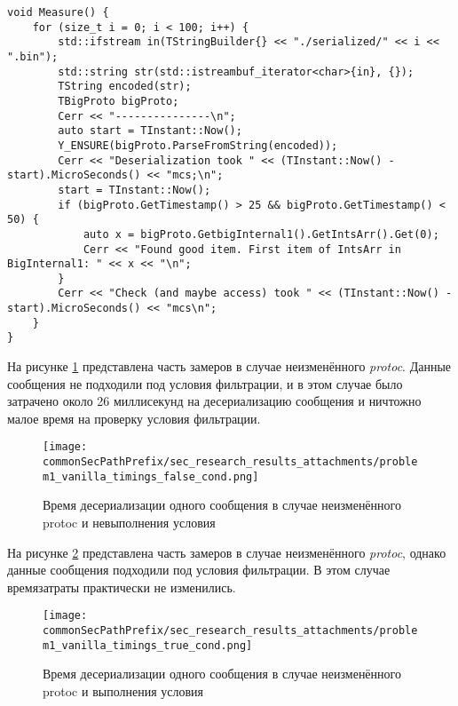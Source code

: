 \begin{lstlisting}[style=CodeListing, captionpos=b, caption={Функция Measure}, label=sec_research:code:problem1_measure]
void Measure() {
    for (size_t i = 0; i < 100; i++) {
        std::ifstream in(TStringBuilder{} << "./serialized/" << i << ".bin");
        std::string str(std::istreambuf_iterator<char>{in}, {});
        TString encoded(str);
        TBigProto bigProto;
        Cerr << "---------------\n";
        auto start = TInstant::Now();
        Y_ENSURE(bigProto.ParseFromString(encoded));
        Cerr << "Deserialization took " << (TInstant::Now() - start).MicroSeconds() << "mcs;\n";
        start = TInstant::Now();
        if (bigProto.GetTimestamp() > 25 && bigProto.GetTimestamp() < 50) {
            auto x = bigProto.GetbigInternal1().GetIntsArr().Get(0);
            Cerr << "Found good item. First item of IntsArr in BigInternal1: " << x << "\n";
        }
        Cerr << "Check (and maybe access) took " << (TInstant::Now() - start).MicroSeconds() << "mcs\n";
    }
}
\end{lstlisting}

На рисунке \ref{fig:problem1_vanilla_timings_false_cond} представлена часть замеров в случае неизменённого \textit{protoc}. 
Данные сообщения не подходили под условия фильтрации, и в этом случае было затрачено около 26 миллисекунд на десериализацию сообщения и ничтожно малое время на проверку условия фильтрации.

\begin{figure}[H]
    \centering
    \texttt{[image: \\commonSecPathPrefix/sec\_research\_results\_attachments/problem1\_vanilla\_timings\_false\_cond.png]}
    \caption{Время десериализации одного сообщения в случае неизменённого protoc и невыполнения условия}
    \label{fig:problem1_vanilla_timings_false_cond}
\end{figure}

На рисунке \ref{fig:problem1_vanilla_timings_true_cond} представлена часть замеров в случае неизменённого \textit{protoc}, однако данные сообщения подходили под условия фильтрации. В этом случае времязатраты практически не изменились.

\begin{figure}[H]
    \centering
    \texttt{[image: \\commonSecPathPrefix/sec\_research\_results\_attachments/problem1\_vanilla\_timings\_true\_cond.png]}
    \caption{Время десериализации одного сообщения в случае неизменённого protoc и выполнения условия}
    \label{fig:problem1_vanilla_timings_true_cond}
\end{figure}


